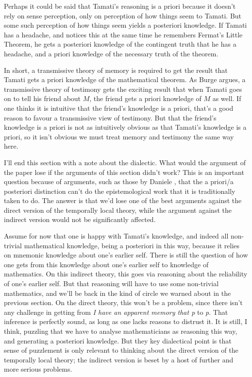 Perhaps it could be said that Tamati's reasoning is a priori because it doesn't rely on sense perception, only on perception of how things seem to Tamati. But some such perception of how things seem yields a posteriori knowledge. If Tamati has a headache, and notices this at the same time he remembers Fermat's Little Theorem, he gets a posteriori knowledge of the contingent truth that he has a headache, and a priori knowledge of the necessary truth of the theorem.

In short, a transmissive theory of memory is required to get the result that Tamati gets a priori knowledge of the mathematical theorem. As Burge argues, a transmissive theory of testimony gets the exciting result that when Tamati goes on to tell his friend about $M$, the friend gets a priori knowledge of $M$ as well. If one thinks it is intuitive that the friend's knowledge is a priori, that's a good reason to favour a transmissive view of testimony. But that the friend's knowledge is a priori is not as intuitively obvious as that Tamati's knowledge is a priori, so it isn't obvious we must treat memory and testimony the same way here.

I'll end this section with a note about the dialectic. What would the argument of the paper lose if the arguments of this section didn't work? This is an important question because of arguments, such as those by Daniele  \citet[Ch. 3]{Sgaravatti2012}, that the a priori\slash a posteriori distinction can't do the epistemological work that it is traditionally taken to do. The answer is that we'd lose one of the best arguments against the direct version of the temporally local theory, while the argument against the indirect version would not be significantly affected.

Assume for now that one is happy with Tamati's knowledge, and indeed all non-trivial mathematical knowledge, being a posteriori in this way, because it relies on mnemonic knowledge about one's earlier self. There is still the question of how one gets from this knowledge about one's earlier self to knowledge of mathematics. On this indirect theory, this goes via reasoning about the reliability of one's earlier self. But that reasoning will have to use some non-trivial mathematics, and we'll be back in the kind of circle we warned about in the previous section. On the direct theory, this won't be a problem, since there isn't any challenge in getting from \emph{I have an apparent memory that p} to \emph{p}. That inference is perfectly sound, as long as one lacks reasons to distrust it. It is still, I think, puzzling that we have to analyse mathematicians as reasoning this way, and generating a posteriori knowledge. But they key dialectical point is that sense of puzzlement is only relevant to thinking about the direct version of the temporally local theory; the indirect version is beset by a host of further and more serious problems.

